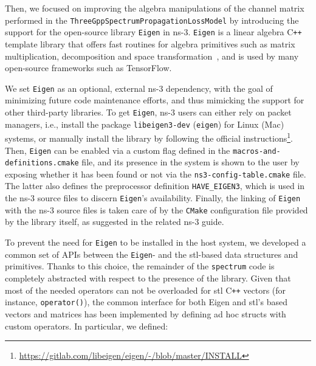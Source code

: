 Then, we focused on improving the algebra manipulations of the channel matrix performed in the \texttt{Three\-Gpp\-Spectrum\-Propagation\-Loss\-Model} by introducing the support for the open-source library \texttt{Eigen} in ns-3. \texttt{Eigen} is a linear algebra C\texttt{++} template library that offers fast routines for algebra primitives such as matrix multiplication, decomposition and space transformation~\cite{eigenweb}, and is used by many open-source frameworks such as TensorFlow. 

We set \texttt{Eigen} as an optional, external ns-3 dependency, with the goal of minimizing future code maintenance efforts, %
and thus mimicking the support for other third-party libraries. To get \texttt{Eigen}, ns-3 users can either rely on packet managers, i.e., install the package \texttt{libeigen3-dev} (\texttt{eigen}) for Linux (Mac) systems, or manually install the library by following the official instructions\footnote{\url{https://gitlab.com/libeigen/eigen/-/blob/master/INSTALL}}. Then, \texttt{Eigen} can be enabled via a custom flag defined in the \texttt{macros-\-and-\-definitions.cmake} file, and its presence in the system is shown to the user by exposing whether it has been found or not via the \texttt{ns3-\-config-\-table.cmake} file. The latter also defines the preprocessor definition \texttt{HAVE\_EIGEN3}, which is used in the ns-3 source files to discern \texttt{Eigen}'s availability. Finally, the linking of \texttt{Eigen} with the ns-3 source files is taken care of by the \texttt{CMake} configuration file provided by the library itself, as suggested in the related ns-3 guide.

To prevent the need for \texttt{Eigen} to be installed in the host system, we developed a common set of APIs between the \texttt{Eigen}- and the \gls{stl}-based data structures and primitives. Thanks to this choice, the remainder of the \texttt{spectrum} code is completely abstracted with respect to the presence of the library.
Given that most of the needed operators can not be overloaded for \gls{stl} C\texttt{++} vectors (for instance, \texttt{operator()}), the common interface for both Eigen and \gls{stl}’s based vectors and matrices has been implemented by defining ad hoc structs with custom operators. In particular, we defined:

